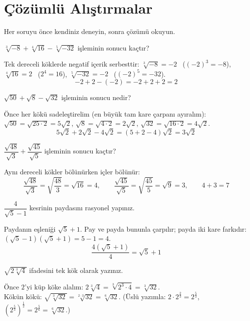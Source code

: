 \section{Çözümlü Alıştırmalar}
Her soruyu önce kendiniz deneyin, sonra çözümü okuyun.

\begin{alistirma}
\(\sqrt[3]{-8}+\sqrt[4]{16}-\sqrt[5]{-32}\) işleminin sonucu kaçtır?
\end{alistirma}
\begin{cozum}
Tek dereceli köklerde negatif içerik serbesttir:
\(\sqrt[3]{-8}=-2\) \ (\((-2)^3=-8\)), \quad \(\sqrt[4]{16}=2\) \ (\(2^4=16\)), \quad \(\sqrt[5]{-32}=-2\) \ (\((-2)^5=-32\)).
\[-2+2-(-2)=-2+2+2=2\]
\end{cozum}

\begin{alistirma}
\(\sqrt{50}+\sqrt8-\sqrt{32}\) işleminin sonucu nedir?
\end{alistirma}
\begin{cozum}
Önce her kökü sadeleştirelim (en büyük tam kare çarpanı ayıralım):\\
\(\sqrt{50}=\sqrt{25\cdot 2}=5\sqrt2\), \quad \(\sqrt8=\sqrt{4\cdot 2}=2\sqrt2\), \quad \(\sqrt{32}=\sqrt{16\cdot 2}=4\sqrt2\).
\[5\sqrt2+2\sqrt2-4\sqrt2=(5+2-4)\sqrt2=3\sqrt2\]
\end{cozum}

\begin{alistirma}
\(\dfrac{\sqrt{48}}{\sqrt3}+\dfrac{\sqrt{45}}{\sqrt5}\) işleminin sonucu kaçtır?
\end{alistirma}
\begin{cozum}
Aynı dereceli kökler bölünürken içler bölünür:
\[\frac{\sqrt{48}}{\sqrt3}=\sqrt{\frac{48}{3}}=\sqrt{16}=4,\qquad \frac{\sqrt{45}}{\sqrt5}=\sqrt{\frac{45}{5}}=\sqrt9=3,\qquad 4+3=7\]
\end{cozum}

\begin{alistirma}
\(\dfrac{4}{\sqrt5-1}\) kesrinin paydasını rasyonel yapınız.
\end{alistirma}
\begin{cozum}
Paydanın eşleniği \(\sqrt5+1\). Pay ve payda bununla çarpılır; payda iki kare farkıdır:
\((\sqrt5-1)(\sqrt5+1)=5-1=4\).
\[\frac{4(\sqrt5+1)}{4}=\sqrt5+1\]
\end{cozum}

\begin{alistirma}
\(\sqrt{2\sqrt[3]{4}}\) ifadesini tek kök olarak yazınız.
\end{alistirma}
\begin{cozum}
Önce \(2\)'yi küp köke alalım: \(2\sqrt[3]{4}=\sqrt[3]{2^3\cdot 4}=\sqrt[3]{32}\).\\
Kökün kökü: \(\sqrt{\sqrt[3]{32}}=\sqrt[2\cdot 3]{32}=\sqrt[6]{32}\). \quad (Üslü yazımla: \(2\cdot 2^{\frac23}=2^{\frac53}\), \ \(\left(2^{\frac53}\right)^{\frac12}=2^{\frac56}=\sqrt[6]{32}\).)
\end{cozum}

